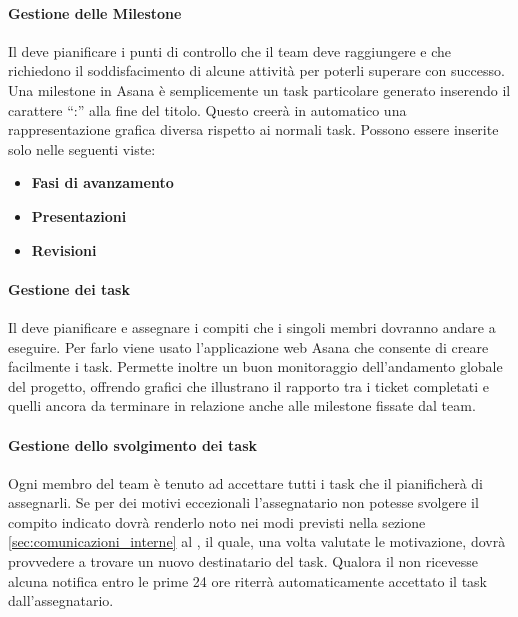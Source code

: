 			\paragraph{Gestione delle Milestone} %
			\label{par:gestione_delle_milestone}
			Il \roleProjectManager{} deve pianificare i punti di controllo che il team deve raggiungere e che richiedono il soddisfacimento di alcune attività per poterli superare con successo. \newline
			Una milestone in Asana è semplicemente un task particolare generato inserendo il carattere ``:'' alla fine del titolo. Questo creerà in automatico una rappresentazione grafica diversa rispetto ai normali task. \newline
			Possono essere inserite solo nelle seguenti viste:
				\begin{itemize}
					\item \textbf{Fasi di avanzamento}
					\item \textbf{Presentazioni}
					\item \textbf{Revisioni}
				\end{itemize}
			
			\paragraph{Gestione dei task}
			\label{sec:gestione_dei_task}
			Il \roleProjectManager{} deve pianificare e assegnare i compiti che i singoli membri dovranno andare a eseguire. Per farlo viene usato l'applicazione web Asana che consente di creare facilmente i task. \newline
			Permette inoltre un buon monitoraggio dell'andamento globale del progetto, offrendo grafici che illustrano il rapporto tra i ticket completati e quelli ancora da terminare in relazione anche alle milestone fissate dal team.
			
			\paragraph{Gestione dello svolgimento dei task} %
			\label{par:gestione_dello_svolgimento_dei_task}
			Ogni membro del team è tenuto ad accettare tutti i task che il \roleProjectManager{} pianificherà di assegnarli. \newline
			Se per dei motivi eccezionali l'assegnatario non potesse svolgere il compito indicato dovrà renderlo noto nei modi previsti nella sezione \ref{sec:comunicazioni_interne} al \roleProjectManager, il quale, una volta valutate le motivazione, dovrà provvedere a trovare un nuovo destinatario del task. \newline
			Qualora il \roleProjectManager{} non ricevesse alcuna notifica entro le prime 24 ore riterrà automaticamente accettato il task dall'assegnatario.
			
